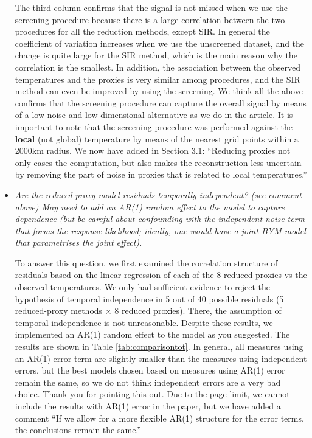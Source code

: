 \documentclass[11pt]{article}
\newcommand{\bl}[1]{\color{red}\textbf{[Bo: #1]}\normalcolor}
\begin{document}
\begin{itemize}
The third column confirms that the signal is not missed when we
use the screening procedure because there is a large correlation between the two
procedures for all the reduction methods, except SIR. In general the coefficient
of variation increases when we use the unscreened dataset, and the change is
quite large for the SIR method, which is the main reason why the correlation is
the smallest. In addition, the association between the observed temperatures and
the proxies is very similar among procedures, and the SIR method can even be improved
by using the screening. We think all the above confirms that the screening procedure can capture
the overall signal by means of a low-noise and low-dimensional alternative as we
do in the article. It is important to note that the screening procedure was
performed against the \textbf{local} (not global) temperature by means of the nearest grid points
within a 2000km radius. We now have added in Section 3.1: ``Reducing proxies not only eases the computation, but
also makes the reconstruction less uncertain by removing the part of noise in
proxies that is related to local temperatures.'' 




\item \textit{Are the reduced proxy model residuals temporally independent? (see
  comment above) May need to add an AR(1) random effect to the model to capture
  dependence (but be careful about confounding with the independent
  noise term that forms the response likelihood; ideally, one would
  have a joint BYM model that parametrises the joint effect).}

To answer this question, we first examined the correlation structure of residuals based on the linear regression of
each of the 8 reduced proxies vs the observed temperatures. We only had sufficient
evidence to reject the hypothesis of temporal independence in 5 out of 40
possible residuals (5 reduced-proxy methods $\times$ 8 reduced proxies). There, the assumption of temporal independence is not unreasonable. Despite these results, we implemented an AR(1) random effect to the model as you
suggested. The results are shown in Table \ref{tab:comparisontot}. In general, 
all measures using an AR(1) error term are slightly smaller than the measures using independent errors, but the best
models chosen based on measures using AR(1) error remain the same, so we do not think independent errors are a very bad choice. Thank you for pointing this out. Due to the page limit, we cannot include the results with AR(1) error in the paper, but we have added a comment ``If we allow for a more flexible AR(1) structure for the error terms, the conclusions remain the same.''



\end{itemize}
\end{document}
